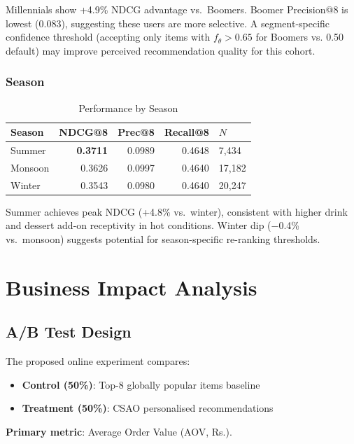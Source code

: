 \documentclass[conference]{IEEEtran}
\newcommand{\rupee}{Rs.}
\begin{document}
Millennials show +4.9\% NDCG advantage vs.\ Boomers. Boomer Precision@8 is
lowest (0.083), suggesting these users are more selective. A segment-specific
confidence threshold (accepting only items with $f_\theta > 0.65$ for Boomers
vs. 0.50 default) may improve perceived recommendation quality for this cohort.

\subsubsection{Season}

\begin{table}[h]
\caption{Performance by Season}
\centering
\begin{tabular}{lrrrl}
\toprule
Season & NDCG@8 & Prec@8 & Recall@8 & $N$ \\
\midrule
Summer  & \textbf{0.3711} & 0.0989 & 0.4648 &  7,434 \\
Monsoon & 0.3626 & 0.0997 & 0.4640 & 17,182 \\
Winter  & 0.3543 & 0.0980 & 0.4640 & 20,247 \\
\bottomrule
\end{tabular}
\end{table}

Summer achieves peak NDCG (+4.8\% vs.\ winter), consistent with higher
drink and dessert add-on receptivity in hot conditions. Winter dip ($-$0.4\%
vs.\ monsoon) suggests potential for season-specific re-ranking thresholds.


\section{Business Impact Analysis}

\subsection{A/B Test Design}

The proposed online experiment compares:
\begin{itemize}
  \item \textbf{Control (50\%)}: Top-8 globally popular items baseline
  \item \textbf{Treatment (50\%)}: CSAO personalised recommendations
\end{itemize}

\textbf{Primary metric}: Average Order Value (AOV, \rupee).
\end{document}
